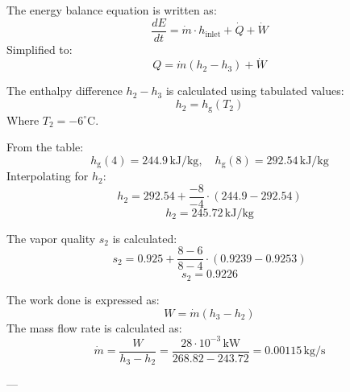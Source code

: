 The energy balance equation is written as:  
\[
\frac{dE}{dt} = \dot{m} \cdot h_{\text{inlet}} + \dot{Q} + \dot{W}
\]  
Simplified to:  
\[
Q = \dot{m}(h_2 - h_3) + \dot{W}
\]  

The enthalpy difference \( h_2 - h_3 \) is calculated using tabulated values:  
\[
h_2 = h_{\text{g}}(T_2)
\]  
Where \( T_2 = -6^\circ\text{C} \).  

From the table:  
\[
h_{\text{g}}(4) = 244.9 \, \text{kJ/kg}, \quad h_{\text{g}}(8) = 292.54 \, \text{kJ/kg}
\]  
Interpolating for \( h_2 \):  
\[
h_2 = 292.54 + \frac{-8}{-4} \cdot (244.9 - 292.54)
\]  
\[
h_2 = 245.72 \, \text{kJ/kg}
\]  

The vapor quality \( s_2 \) is calculated:  
\[
s_2 = 0.925 + \frac{8 - 6}{8 - 4} \cdot (0.9239 - 0.9253)
\]  
\[
s_2 = 0.9226
\]

The work done is expressed as:  
\[
W = \dot{m} (h_3 - h_2)
\]  
The mass flow rate is calculated as:  
\[
\dot{m} = \frac{W}{h_3 - h_2} = \frac{28 \cdot 10^{-3} \, \text{kW}}{268.82 - 243.72} = 0.00115 \, \text{kg/s}
\]  

---